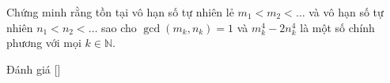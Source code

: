 \ifshowproblem
\begin{problem}\label{problem:ROU-2015-SOM-J-P2}
    Chứng minh rằng tồn tại vô hạn số tự nhiên lẻ \( m_1 < m_2 < \ldots \) và vô hạn số tự nhiên \( n_1 < n_2 < \ldots \) 
    sao cho \( \gcd(m_k, n_k) = 1 \) và \( m_k^4 - 2n_k^4 \) là một số chính phương với mọi \( k \in \mathbb{N} \).
\end{problem}
\fi

\ifshowinfo
Đánh giá [\textbf{}]\footnotemark
{}
\fi